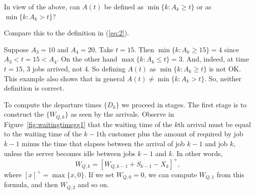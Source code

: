 \begin{exercise}\label{ex:22}
  In view of the above, can  $A(t)$ be defined as $\min\{k : A_k \geq t\}$ or as $\min\{k: A_k > t\}$?
  \begin{hint}
Compare this to the definition in (\ref{eq:2}).
  \end{hint}
  \begin{solution}
    Suppose $A_3 = 10$ and $A_4 = 20$. Take $t=15$. Then
    $\min\{k : A_k \geq 15\} = 4$ since $A_3 < t=15 < A_4$. On the
    other hand $\max\{k : A_k \leq t\} = 3$. And, indeed, at time $t=15$, 3 jobs arrived, not 4. So defining $A(t)$ as $\min\{k : A_k \geq t\}$ is not OK.  This example also shows that in general $A(t) \neq \min\{k : A_k > t\}$. So, neither definition is correct. 

  \end{solution}
\end{exercise}

To compute the departure times $\{D_k\}$ we proceed in stages.
The first stage is to construct the  $\{W_{Q,k}\}$ as seen by the arrivals.
Observe in Figure~\ref{fig:waitingtimegg1} that the waiting time of the $k$th arrival must be equal to the waiting time of the $k-1$th customer plus the amount of  required by job $k-1$ minus the time that elapses between the arrival of job $k-1$ and job $k$, unless the server becomes idle between jobs $k-1$ and $k$.
In other words,
\begin{equation}\label{eq:56}
  W_{Q,k} = [W_{Q,k-1} + S_{k-1}-X_k]^+,
\end{equation}
where $[x]^+ = \max\{x, 0\}$. If we set $W_{Q,0}=0$, we can compute
$W_{Q,1}$ from this formula, and then $W_{Q,2}$ and so on.

